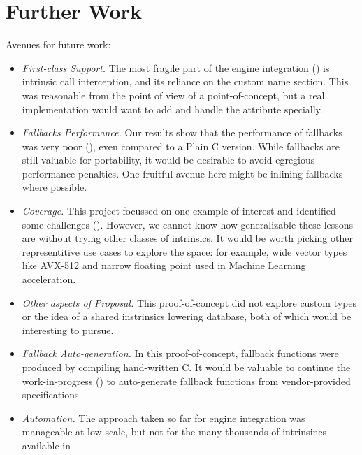 \section{Further Work}
\label{sec:future}

Avenues for future work:

\begin{itemize}
    \item \emph{First-class  Support.}
        The most fragile part of the engine integration () is
        intrinsic call interception, and its reliance on the custom name
        section. This was reasonable from the point of view of a
        point-of-concept, but a real implementation would want to add and handle
        the  attribute specially.
    \item \emph{Fallbacks Performance.}
        Our results show that the performance of \wasm fallbacks was very poor
        (), even compared to a Plain C version.  While fallbacks
        are still valuable for portability, it would be desirable to avoid
        egregious performance penalties.  One fruitful avenue here might be
        inlining fallbacks where possible.
    \item \emph{Coverage.}
        This project focussed on one example of interest and identified some
        challenges (). However, we cannot know how
        generalizable these lessons are without trying other classes of
        intrinsics. It would be worth picking other representitive use cases to
        explore the space: for example, wide vector types like AVX-512 and
        narrow floating point used in Machine Learning acceleration.
    \item \emph{Other aspects of  Proposal.}
        This proof-of-concept did not explore custom types or the idea of a
        shared instrinsics lowering database, both of which would be interesting
        to pursue.
    \item \emph{Fallback Auto-generation.}
        In this proof-of-concept, fallback functions were produced by compiling
        hand-written C.  It would be valuable to continue the work-in-progress
        () to auto-generate fallback functions from vendor-provided
        specifications.
    \item \emph{Automation.}
        The approach taken so far for engine integration was manageable at low
        scale, but not for the many thousands of intrinsincs available in

\end{itemize}
